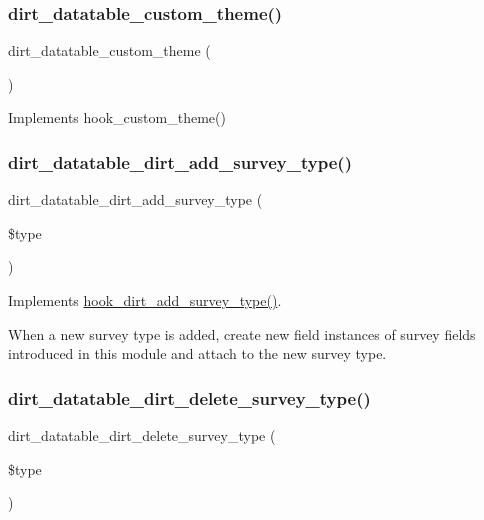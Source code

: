 \subsubsection{\texorpdfstring{dirt\+\_\+datatable\+\_\+custom\+\_\+theme()}{dirt\_datatable\_custom\_theme()}}
{\footnotesize\ttfamily dirt\+\_\+datatable\+\_\+custom\+\_\+theme (\begin{DoxyParamCaption}{ }\end{DoxyParamCaption})}

Implements hook\+\_\+custom\+\_\+theme() \mbox{\label{dirt__datatable_8module_a0a6b39201839d85225f73026ff5368df}} 
\subsubsection{\texorpdfstring{dirt\+\_\+datatable\+\_\+dirt\+\_\+add\+\_\+survey\+\_\+type()}{dirt\_datatable\_dirt\_add\_survey\_type()}}
{\footnotesize\ttfamily dirt\+\_\+datatable\+\_\+dirt\+\_\+add\+\_\+survey\+\_\+type (\begin{DoxyParamCaption}\item[{}]{\$type }\end{DoxyParamCaption})}

Implements \mbox{\hyperlink{dirt_8api_8php_a04e0b3c0458c02ca470655b669bb16c1}{hook\+\_\+dirt\+\_\+add\+\_\+survey\+\_\+type()}}.

When a new survey type is added, create new field instances of survey fields introduced in this module and attach to the new survey type. \mbox{\label{dirt__datatable_8module_aa0c992ebb0977b4dcb7fe8b44bd2843f}} 
\subsubsection{\texorpdfstring{dirt\+\_\+datatable\+\_\+dirt\+\_\+delete\+\_\+survey\+\_\+type()}{dirt\_datatable\_dirt\_delete\_survey\_type()}}
{\footnotesize\ttfamily dirt\+\_\+datatable\+\_\+dirt\+\_\+delete\+\_\+survey\+\_\+type (\begin{DoxyParamCaption}\item[{}]{\$type }\end{DoxyParamCaption})}

